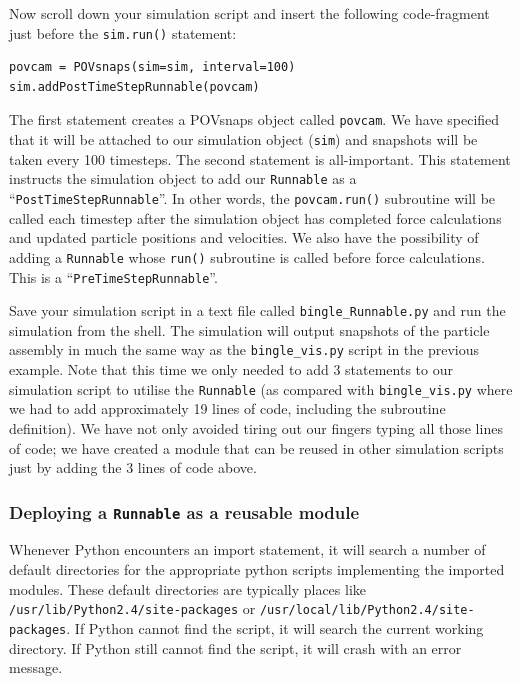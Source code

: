 Now scroll down your simulation script and insert the following code-fragment just before the \texttt{sim.run()} statement:

\begin{verbatim}
povcam = POVsnaps(sim=sim, interval=100)
sim.addPostTimeStepRunnable(povcam)
\end{verbatim}

\noindent
The first statement creates a POVsnaps object called \texttt{povcam}. We have specified that it will be attached to our simulation object (\texttt{sim}) and snapshots will be taken every 100 timesteps. The second statement is all-important. This statement instructs the simulation object to add our \texttt{Runnable} as a ``\texttt{PostTimeStepRunnable}''. In other words, the \texttt{povcam.run()} subroutine will be called each timestep after the simulation object has completed force calculations and updated particle positions and velocities. We also have the possibility of adding a \texttt{Runnable} whose \texttt{run()} subroutine is called before force calculations. This is a ``\texttt{PreTimeStepRunnable}''.

Save your simulation script in a text file called \texttt{bingle\_Runnable.py} and run the simulation from the shell. The simulation will output snapshots of the particle assembly in much the same way as the \texttt{bingle\_vis.py} script in the previous example. Note that this time we only needed to add 3 statements to our simulation script to utilise the \texttt{Runnable} (as compared with \texttt{bingle\_vis.py} where we had to add approximately 19 lines of code, including the subroutine definition). We have not only avoided tiring out our fingers typing all those lines of code; we have created a module that can be reused in other simulation scripts just by adding the 3 lines of code above. 

\subsubsection{Deploying a \texttt{Runnable} as a reusable module}

Whenever Python encounters an import statement, it will search a number of default directories for the appropriate python scripts implementing the imported modules. These default directories are typically places like \texttt{/usr/lib/Python2.4/site-packages} or \linebreak \texttt{/usr/local/lib/Python2.4/site-packages}. If Python cannot find the script, it will search the current working directory. If Python still cannot find the script, it will crash with an error message. 

